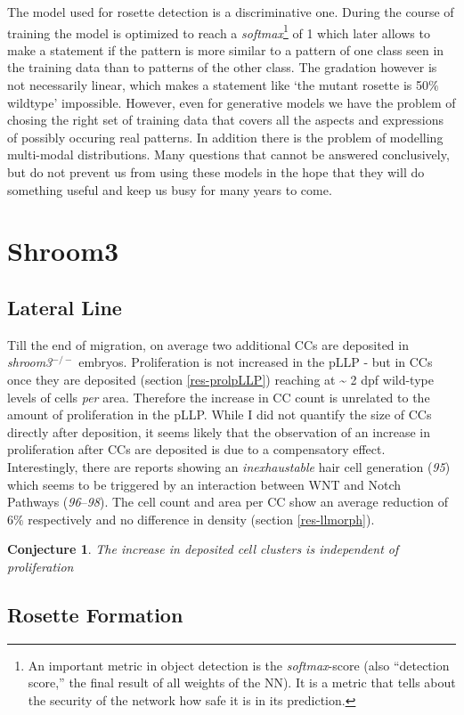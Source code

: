 \documentclass[10pt, b5paper, singlespacinge, twoside]{reedthesis} %
\newtheorem{conjecture}{Conjecture}[chapter]
\theoremstyle{definition}
\theoremstyle{definition}
\theoremstyle{definition}
\theoremstyle{remark}
\begin{document}
The model used for rosette detection is a discriminative one. During the course of training the model is optimized to reach a \emph{softmax}\footnote{An important metric in object detection is the \emph{softmax}-score (also ``detection score,'' the final result of all weights of the NN). It is a metric that tells about the security of the network how safe it is in its prediction.} of 1 which later allows to make a statement if the pattern is more similar to a pattern of one class seen in the training data than to patterns of the other class. The gradation however is not necessarily linear, which makes a statement like `the mutant rosette is 50\(\%\) wildtype' impossible. However, even for generative models we have the problem of chosing the right set of training data that covers all the aspects and expressions of possibly occuring real patterns. In addition there is the problem of modelling multi-modal distributions. Many questions that cannot be answered conclusively, but do not prevent us from using these models in the hope that they will do something useful and keep us busy for many years to come.

\hypertarget{shroom3-1}{%
\section{Shroom3}\label{shroom3-1}}

\hypertarget{lateral-line}{%
\subsection{Lateral Line}\label{lateral-line}}

Till the end of migration, on average two additional CCs are deposited in \emph{shroom3}\(^{-/-}\) embryos. Proliferation is not increased in the pLLP - but in CCs once they are deposited (section \ref{res-prolpLLP}) reaching at \textasciitilde{} 2 dpf wild-type levels of cells \emph{per} area. Therefore the increase in CC count is unrelated to the amount of proliferation in the pLLP. While I did not quantify the size of CCs directly after deposition, it seems likely that the observation of an increase in proliferation after CCs are deposited is due to a compensatory effect. Interestingly, there are reports showing an \emph{inexhaustable} hair cell generation (\emph{95}) which seems to be triggered by an interaction between WNT and Notch Pathways (\emph{96}--\emph{98}). The cell count and area per CC show an average reduction of 6\(\%\) respectively and no difference in density (section \ref{res-llmorph}).
\begin{conjecture}
\protect\hypertarget{cnj:unnamed-chunk-12}{}{\label{cnj:unnamed-chunk-12} }The increase in deposited cell clusters is independent of proliferation
\end{conjecture}
\hypertarget{rosette-formation-1}{%
\subsection{Rosette Formation}\label{rosette-formation-1}}
\end{document}
